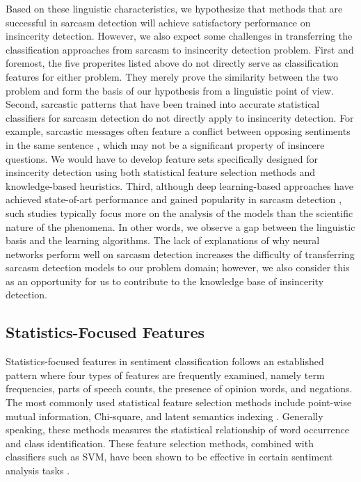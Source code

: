 \documentclass[12pt]{diazessay} %
\begin{document}
Based on these linguistic characteristics, we hypothesize that methods that are successful in sarcasm detection will achieve satisfactory performance on insincerity detection. However, we also expect some challenges in transferring the classification approaches from sarcasm to insincerity detection problem. First and foremost, the five properites listed above do not directly serve as classification features for either problem. They merely prove the similarity between the two problem and form the basis of our hypothesis from a linguistic point of view. Second, sarcastic patterns that have been trained into accurate statistical classifiers for sarcasm detection do not directly apply to insincerity detection. For example, sarcastic messages often feature a conflict between opposing sentiments in the same sentence \citep{joshi2017}, which may not be a significant property of insincere questions. We would have to develop feature sets specifically designed for insincerity detection using both statistical feature selection methods and knowledge-based heuristics. Third, although deep learning-based approaches have achieved state-of-art performance and gained popularity in sarcasm detection \citep{joshi2017}, such studies typically focus more on the analysis of the models than the scientific nature of the phenomena. In other words, we observe a gap between the linguistic basis and the learning algorithms. The lack of explanations of why neural networks perform well on sarcasm detection increases the difficulty of transferring sarcasm detection models to our problem domain; however, we also consider this as an opportunity for us to contribute to the knowledge base of insincerity detection. 

\subsection{Statistics-Focused Features} \label{statistic-features}

Statistics-focused features in sentiment classification follows an established pattern where four types of features are frequently examined, namely term frequencies, parts of speech counts, the presence of opinion words, and negations\citep{medhat2014}. The most commonly used statistical feature selection methods include point-wise mutual information, Chi-square, and latent semantics indexing \citep{medhat2014}. Generally speaking, these methods measures the statistical relationship of word occurrence and class identification. These feature selection methods, combined with classifiers such as SVM, have been shown to be effective in certain sentiment analysis tasks \citep{medhat2014}.
 
\end{document}
